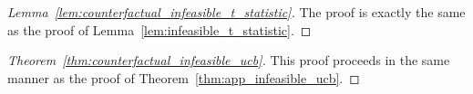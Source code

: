 \begin{proof}[Lemma~\ref{lem:counterfactual_infeasible_t_statistic}]
  The proof is exactly the same as the proof of
  Lemma~\ref{lem:infeasible_t_statistic}.
\end{proof}

\begin{proof}[Theorem~\ref{thm:counterfactual_infeasible_ucb}]
  This proof proceeds in the same manner as the proof of
  Theorem~\ref{thm:app_infeasible_ucb}.
\end{proof}
